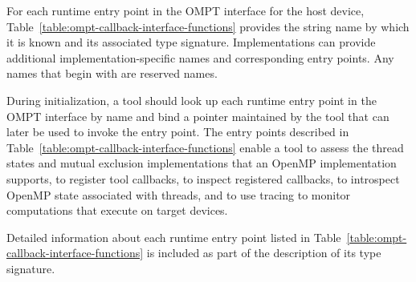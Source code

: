 For each runtime entry point in the OMPT interface for the host device,
Table~\ref{table:ompt-callback-interface-functions} provides the string
name by which it is known and its associated type signature. Implementations
can provide additional implementation-specific names and corresponding
entry points.  Any names that begin with  are reserved names.

During initialization, a tool should look up each runtime entry point in the
OMPT interface by name and bind a pointer maintained by the tool that can later
be used to invoke the entry point. The entry points described in 
Table~\ref{table:ompt-callback-interface-functions} enable a tool to assess
the thread states and mutual exclusion implementations that an OpenMP
implementation supports, to register tool callbacks, to inspect registered 
callbacks, to introspect OpenMP state associated with threads, and to use 
tracing to monitor computations that execute on target devices.

Detailed information about each runtime entry point listed in
Table~\ref{table:ompt-callback-interface-functions} is included as
part of the description of its type signature.

